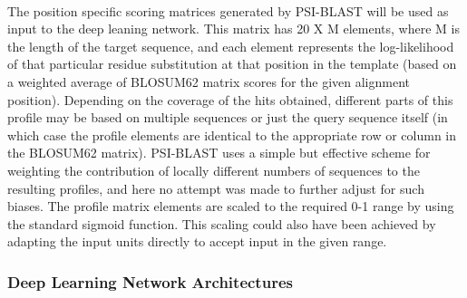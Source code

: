 \documentclass[12pt]{article}
\numberwithin{figure}{section}
\begin{document}
\paragraph{}
The position specific scoring matrices generated by PSI-BLAST will be used as input to the deep leaning network. This matrix has 20 X M elements, where M is the length of the target sequence, and each element represents the log-likelihood of that particular residue substitution at that position in the template (based on a weighted average of BLOSUM62 matrix scores for the given alignment position). Depending on the coverage of the hits obtained, different parts of this profile may be based on multiple sequences or just the query sequence itself (in which case the profile elements are identical to the appropriate row or column in the BLOSUM62 matrix). PSI-BLAST uses a simple but effective scheme for weighting the contribution of locally different numbers of sequences to the resulting profiles, and here no attempt was made to further adjust for such biases. The profile matrix elements are scaled to the required 0-1 range by using the standard sigmoid function. This scaling could also have been achieved by adapting the input units directly to accept input in the given range.
\subsubsection{Deep Learning Network Architectures}
\end{document}
